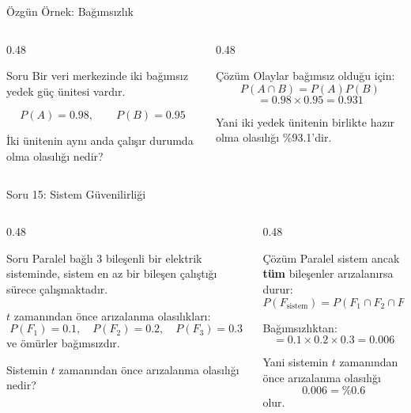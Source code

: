 \documentclass[light]{lutbeamer}
\begin{document}
\begin{frame}{Özgün Örnek: Bağımsızlık}
\small
\begin{columns}[T,onlytextwidth]
    \begin{column}{0.48\textwidth}
        \begin{block}{Soru}
            Bir veri merkezinde iki bağımsız yedek güç ünitesi vardır.

            \[
            P(A)=0.98, \qquad P(B)=0.95
            \]

            İki ünitenin aynı anda çalışır durumda olma olasılığı nedir?
        \end{block}
    \end{column}
    \begin{column}{0.48\textwidth}
        \begin{exampleblock}{Çözüm}
            Olaylar bağımsız olduğu için:
            \[
            P(A \cap B)=P(A)P(B)
            \]
            \[
            =0.98 \times 0.95 = 0.931
            \]

            Yani iki yedek ünitenin birlikte hazır olma olasılığı \%93.1'dir.
        \end{exampleblock}
    \end{column}
\end{columns}
\end{frame}

\begin{frame}{Soru 15: Sistem Güvenilirliği}
\scriptsize
\begin{columns}[T,onlytextwidth]
    \begin{column}{0.48\textwidth}
        \begin{block}{Soru}
            Paralel bağlı 3 bileşenli bir elektrik sisteminde, sistem en az bir bileşen çalıştığı sürece çalışmaktadır.

            \vspace{0.15cm}
            $t$ zamanından önce arızalanma olasılıkları:
            \[
            P(F_1)=0.1,\quad P(F_2)=0.2,\quad P(F_3)=0.3
            \]
            ve ömürler bağımsızdır.

            \vspace{0.15cm}
            Sistemin $t$ zamanından önce arızalanma olasılığı nedir?
        \end{block}
    \end{column}
    \begin{column}{0.48\textwidth}
        \begin{exampleblock}{Çözüm}
            Paralel sistem ancak \textbf{tüm} bileşenler arızalanırsa durur:
            \[
            P(F_{\text{sistem}})=P(F_1 \cap F_2 \cap F_3)
            \]

            Bağımsızlıktan:
            \[
            =0.1 \times 0.2 \times 0.3 = 0.006
            \]

            Yani sistemin $t$ zamanından önce arızalanma olasılığı
            \[
            0.006 = \%0.6
            \]
            olur.
        \end{exampleblock}
    \end{column}
\end{columns}
\end{frame}
\end{document}

